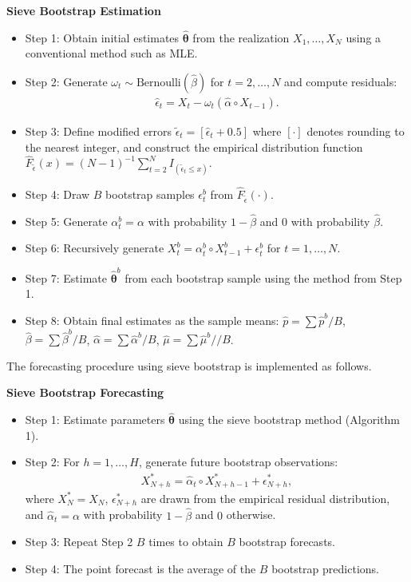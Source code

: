 \documentclass[twoside]{article}
\begin{document}
\begin{alg}\label{alg:sieve}
\textbf{Sieve Bootstrap Estimation}
\begin{itemize}
\item Step 1: Obtain initial estimates $\hat{\boldsymbol{\theta}}$ from the realization $X_1,\ldots,X_N$ using a conventional method such as MLE.
\item Step 2: Generate $\omega_t \sim \text{Bernoulli}(\hat{\beta})$ for $t=2,\ldots,N$ and compute residuals:
\begin{eqnarray*}
\hat{\epsilon}_t = X_t - \omega_t(\hat{\alpha}\circ X_{t-1}).
\end{eqnarray*}
\item Step 3: Define modified errors $\tilde{\epsilon}_t = [\hat{\epsilon}_t + 0.5]$ where $[\cdot]$ denotes rounding to the nearest integer, and construct the empirical distribution function $\hat{F}_{\tilde{\epsilon}}(x) = (N-1)^{-1}\sum_{t=2}^N I_{(\tilde{\epsilon}_t\leq x)}$.
\item Step 4: Draw $B$ bootstrap samples $\epsilon_t^b$ from $\hat{F}_{\tilde{\epsilon}}(\cdot)$.
\item Step 5: Generate $\alpha_t^b = \alpha$ with probability $1-\hat{\beta}$ and $0$ with probability $\hat{\beta}$.
\item Step 6: Recursively generate $X_t^b = \alpha_t^b \circ X_{t-1}^b + \epsilon_t^b$ for $t=1,\ldots,N$.
\item Step 7: Estimate $\hat{\boldsymbol{\theta}}^b$ from each bootstrap sample using the method from Step 1.
\item Step 8: Obtain final estimates as the sample means: $\hat{p}=\sum\hat{p}^b/B$, $\hat{\beta}=\sum\hat{\beta}^b/B$, $\hat{\alpha}=\sum\hat{\alpha}^b/B$, $\hat{\mu}=\sum\hat{\mu}^b//B$.
\end{itemize}
\end{alg}
The forecasting procedure using sieve bootstrap is implemented as follows.

\begin{alg}\label{alg:bootforecast}
\textbf{Sieve Bootstrap Forecasting}
\begin{itemize}
\item Step 1: Estimate parameters $\hat{\boldsymbol{\theta}}$ using the sieve bootstrap method (Algorithm 1).
\item Step 2: For $h=1,\ldots,H$, generate future bootstrap observations:
\begin{eqnarray*}
X_{N+h}^* = \hat{\alpha}_t \circ X_{N+h-1}^* + \epsilon_{N+h}^*,
\end{eqnarray*}
where $X_N^* = X_N$, $\epsilon_{N+h}^*$ are drawn from the empirical residual distribution, and $\hat{\alpha}_t = \alpha$ with probability $1-\hat{\beta}$ and $0$ otherwise.
\item Step 3: Repeat Step 2 $B$ times to obtain $B$ bootstrap forecasts.
\item Step 4: The point forecast is the average of the $B$ bootstrap predictions.
\end{itemize}
\end{alg}
\end{document}
